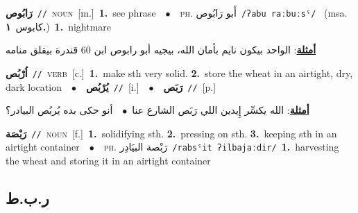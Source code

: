 \documentclass[10pt,a4paper,twoside]{article} %
\begin{document}
\begin{multicols}{2}
{{{{{{{{\setlength\topsep{0pt}\textbf{\foreignlanguage{arabic}{رَابُوص}}\ {\color{gray}\texttt{//}\color{black}}\ \textsc{noun}\ [m.]\ \textbf{1.}~see phrase\ \ $\bullet$\ \ \textsc{ph.} \color{gray} \foreignlanguage{arabic}{أَبو رَابُوص}\color{black}\ {\color{gray}\texttt{/{\sffamily ʔabu raːbuːsˤ}/}\color{black}}\ \color{gray} (msa. \foreignlanguage{arabic}{كابوس}~\foreignlanguage{arabic}{\textbf{١.}})\color{black}\ \textbf{1.}~nightmare\  \begin{flushright}\color{gray}\foreignlanguage{arabic}{\textbf{\underline{\foreignlanguage{arabic}{أمثلة}}}: الواحد بيكون نايم بأمان الله، بيجيه أبو رابوص ابن 60 قندرة بيقلق منامه}\end{flushright}\color{black}} \vspace{2mm}

{\setlength\topsep{0pt}\textbf{\foreignlanguage{arabic}{اُرْبُص}}\ {\color{gray}\texttt{//}\color{black}}\ \textsc{verb}\ [c.]\ \textbf{1.}~make sth very solid.  \textbf{2.}~store the wheat in an airtight, dry, dark location\ \ $\bullet$\ \ \setlength\topsep{0pt}\textbf{\foreignlanguage{arabic}{يُرْبُص}}\ {\color{gray}\texttt{//}\color{black}}\ [i.]\ \ $\bullet$\ \ \setlength\topsep{0pt}\textbf{\foreignlanguage{arabic}{رَبَص}}\ {\color{gray}\texttt{//}\color{black}}\ [p.]\  \begin{flushright}\color{gray}\foreignlanguage{arabic}{\textbf{\underline{\foreignlanguage{arabic}{أمثلة}}}: الله يكسِّر إِيدين اللي رَبَص الشارع عنا\ $\bullet$\ \  أنو حكى بده يُربُص البيادر؟}\end{flushright}\color{black}} \vspace{2mm}

{\setlength\topsep{0pt}\textbf{\foreignlanguage{arabic}{رَبْصَة}}\ {\color{gray}\texttt{//}\color{black}}\ \textsc{noun}\ [f.]\ \textbf{1.}~solidifying sth.  \textbf{2.}~pressing on sth.  \textbf{3.}~keeping sth in an airtight container\ \ $\bullet$\ \ \textsc{ph.} \color{gray} \foreignlanguage{arabic}{رَبْصة البيَادِر}\color{black}\ {\color{gray}\texttt{/{\sffamily rabsˤit ʔilbajaːdir}/}\color{black}}\ \textbf{1.}~harvesting the wheat and storing it in an airtight container\ 

\vspace{-3mm}
\subsection*{\color{blue}\foreignlanguage{arabic}{ر.ب.ط}\color{blue}{}} 

}}}}}}}}
\end{multicols}
\end{document}
